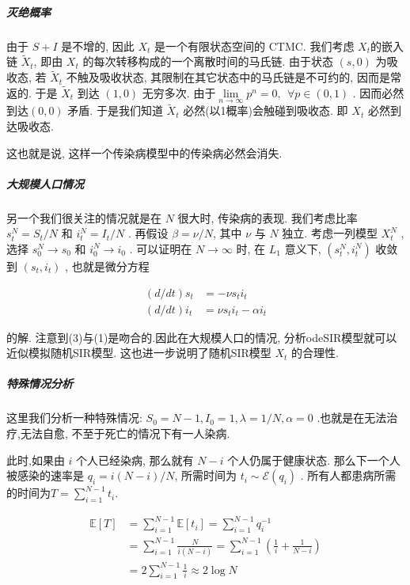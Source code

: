 \documentclass[UTF8]{ctexart}
\begin{document}
			
			\subparagraph{灭绝概率}
			
			由于 \(S+I\) 是不增的, 因此 \(X_t\) 是一个有限状态空间的 CTMC. 我们考虑
			\(X_t\)的嵌入链 \(\tilde X_t\), 即由 \(X_t\)
			的每次转移构成的一个离散时间的马氏链. 由于状态 \((s,0)\) 为吸收态, 若
			\(\tilde X_t\) 不触及吸收状态, 其限制在其它状态中的马氏链是不可约的,
			因而是常返的. 于是 \(\tilde X_t \) 到达 \((1,0)\) 无穷多次.
			由于\(\lim\limits_{n \to \infty}p^n =0,\ \ \forall p \in(0,1)\) .
			因而必然到达\((0,0)\) 矛盾. 于是我们知道 \(\tilde  X_t\)
			必然(以1概率)会触碰到吸收态. 即 \(X_t\) 必然到达吸收态.
			
			这也就是说, 这样一个传染病模型中的传染病必然会消失.
			
			
			\subparagraph{大规模人口情况}
			
			另一个我们很关注的情况就是在 \(N\) 很大时, 传染病的表现. 我们考虑比率
			\(s_t^N =S_t /N\) 和 \(i_t^N = I_t/N\) . 再假设 \(\beta = \nu/N\), 其中
			\(\nu\) 与 \(N\) 独立. 考虑一列模型 \(X_t^N\) , 选择 \(s_0^N \to s_0\)
			和 \(i_0^N \to i_0\) . 可以证明在 \(N \to \infty\) 时, 在 \( L_1\)
			意义下, \((s_t^N, i_t^N)\) 收敛到 \((s_t, i_t)\) , 也就是微分方程
			
			\begin{equation}
			\begin{aligned}
			(d/dt)s_t &= -\nu s_ti_t \\
			(d/dt)i_t &= \nu s_t i_t - \alpha i_t
			\end{aligned}
			\end{equation}
			
			的解. 注意到(3)与(1)是吻合的.因此在大规模人口的情况,
			分析odeSIR模型就可以近似模拟随机SIR模型. 这也进一步说明了随机SIR模型
			\(X_t\) 的合理性.
			
			
			\subparagraph{特殊情况分析}
			
			这里我们分析一种特殊情况:
			\(S_0 = N-1, I_0 =1, \lambda =1/N, \alpha = 0\)
			.也就是在无法治疗,无法自愈, 不至于死亡的情况下有一人染病.
			
			此时,如果由 \(i\) 个人已经染病, 那么就有 \(N-i\) 个人仍属于健康状态.
			那么下一个人被感染的速率是 \(q_i= i(N-i)/N\), 所需时间为
			\(t_i \sim \mathcal{E}(q_i)\) .
			所有人都患病所需的时间为\(T = \sum\limits_{i=1}^{N-1}t_i\).
			
			
			\begin{equation*}
			\begin{aligned}
			\mathbb{E}[T] &= \sum\limits_{i=1}^{N-1}\mathbb{E}[t_i]=\sum\limits_{i=1}^{N-1}q_i^{-1} \\
			&= \sum\limits_{i=1}^{N-1} \frac {N}{i(N-i)} = \sum\limits_{i=1}^{N-1}(\frac{1}{i}+ \frac{1}{N-i})\\
			&= 2\sum\limits_{i=1}^{N-1}\frac{1}{i} \approx 2\log{N}
			\end{aligned}
			\end{equation*}
			
\end{document}
